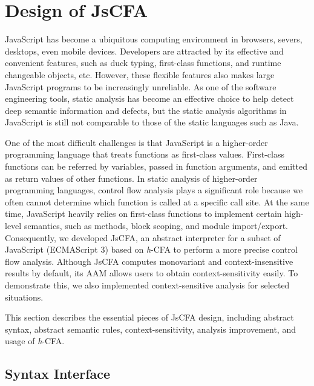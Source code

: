 \documentclass[12pt]{report}
\begin{document}
\chapter{Design of JsCFA}
\label{sec:JsCFA}
JavaScript has become a ubiquitous computing environment in browsers, severs, desktops, even mobile devices. Developers are attracted by its effective and convenient features, such as duck typing, first-class functions, and runtime changeable objects, etc. However, these flexible features also makes large JavaScript programs to be increasingly unreliable.
As one of the software engineering tools, static analysis has become an effective choice to help detect deep semantic information and defects, but the static analysis algorithms in JavaScript is still not comparable to those of the static languages such as Java.

One of the most difficult challenges is that JavaScript is a higher-order programming language that treats functions as first-class values. First-class functions can be referred by variables, passed in function arguments, and emitted as return values of other functions.
In static analysis of higher-order programming languages, control flow analysis plays a significant role because we often cannot determine which function is called at a specific call site.
At the same time, JavaScript heavily relies on first-class functions to implement certain high-level semantics, such as methods, block scoping, and module import/export.
Consequently, we developed JsCFA, an abstract interpreter for a subset of JavaScript (ECMAScript 3) based on \textit{h}-CFA to perform a more precise control flow analysis.
Although JsCFA computes monovariant and context-insensitive results by default, its AAM allows users to obtain context-sensitivity easily.
To demonstrate this, we also implemented context-sensitive analysis for selected situations.

This section describes the essential pieces of JsCFA design, including abstract syntax, abstract semantic rules, context-sensitivity, analysis improvement, and usage of \textit{h}-CFA\@.

\section{Syntax Interface}
\label{sub:Syntax}
\end{document}
